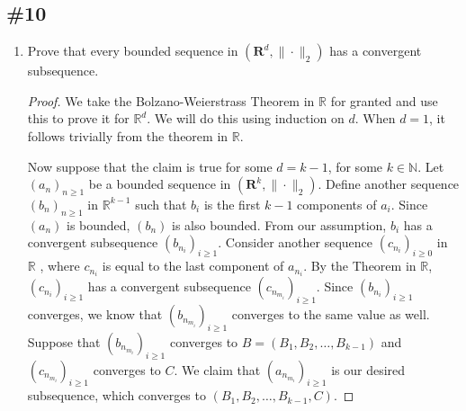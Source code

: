\documentclass{article}
\newcommand{\R}{\mathbf{R}}
\theoremstyle{plain} %
\numberwithin{thm}{section} %
\theoremstyle{definition}
\begin{document}
        \subsection{\#10}

        \begin{enumerate}[label=(\alph*)]
            \item Prove that every bounded sequence in $(\R^d,\|\cdot\|_2)$ has a convergent subsequence.
            
            \begin{proof}
                We take the Bolzano-Weierstrass Theorem in \(\mathbb{R}\) for granted and use this to prove it for \(\mathbb{R}^d\). We will do this using induction on \(d\). When \(d=1\), it follows trivially from the theorem in \(\mathbb{R}\).
    
                Now suppose that the claim is true for some \(d = k-1\), for some \(k \in \mathbb{N}\). Let \((a_n)_{n\geq1} \) be a bounded sequence in \((\R^k,\|\cdot\|_2)\). Define another sequence \((b_n)_{n\geq 1}\) in \(\mathbb{R}^{k-1}\) such that \(b_i\) is the first \(k-1\) components of \(a_i\). Since \((a_n)\) is bounded, \((b_n)\) is also bounded. From our assumption, \(b_i\) has a convergent subsequence \((b_{n_i})_{i\geq1}\). Consider another sequence \((c_{n_i})_{i\geq0}\) in \(\mathbb{R}\) , where \(c_{n_i}\) is equal to the last component of \(a_{n_i}\). By the Theorem in \(\mathbb{R}\), \((c_{n_i})_{i\geq1}\) has a convergent subsequence \((c_{n_{m_i}})_{i\geq1}\). Since \((b_{n_i})_{i\geq1}\) converges, we know that \((b_{n_{m_i}})_{i\geq1}\) converges to the same value as well. Suppose that \((b_{n_{m_i}})_{i\geq1}\) converges to \(B = (B_1, B_2, \dots, B_{k-1})\) and \((c_{n_{m_i}})_{i\geq1}\) converges to \(C\). We claim that \((a_{n_{m_i}})_{i\geq1}\) is our desired subsequence, which converges to \((B_1, B_2, \dots, B_{k-1}, C)\).
    

\end{proof}
\end{enumerate}
\end{document}
